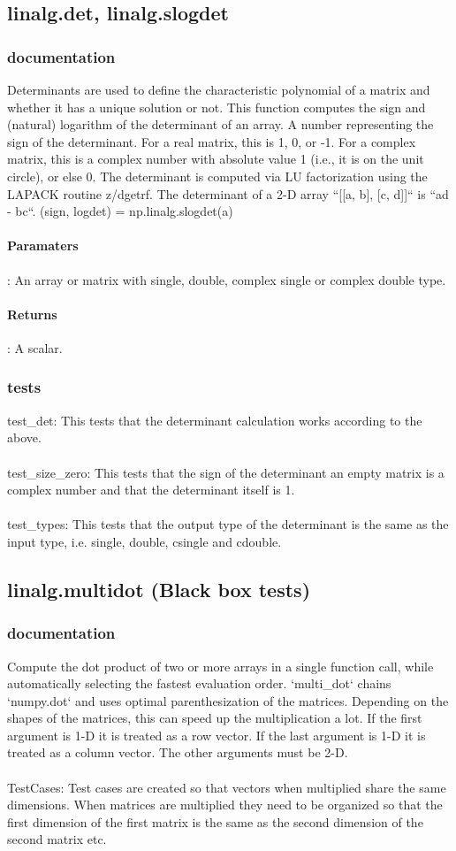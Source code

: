 \documentclass[a4paper,11pt]{article}
\begin{document}
\subsection{linalg.det, linalg.slogdet}
\subsubsection{documentation}
Determinants are used to define the characteristic polynomial of a matrix and whether it has a unique solution or not. This function computes the sign and (natural) logarithm of the determinant of an array. A number representing the sign of the determinant. For a real matrix,
this is 1, 0, or -1. For a complex matrix, this is a complex number with absolute value 1 (i.e., it is on the unit circle), or else 0. The determinant is computed via LU factorization using the LAPACK
routine z/dgetrf. The determinant of a 2-D array ``[[a, b], [c, d]]`` is ``ad - bc``. (sign, logdet) = np.linalg.slogdet(a)
\paragraph{Paramaters}: An array or matrix with single, double, complex single or complex double type. 
\paragraph{Returns}: A scalar. 
\subsubsection{tests}
test\_det: This tests that the determinant calculation works according to the above. \\
\\
test\_size\_zero: This tests that the sign of the determinant an empty matrix is a complex number and that the determinant itself is 1. \\
\\
test\_types: This tests that the output type of the determinant is the same as the input type, i.e. single, double, csingle and cdouble. 

\subsection{linalg.multidot (Black box tests)}
\subsubsection{documentation}
Compute the dot product of two or more arrays in a single function call, while automatically selecting the fastest evaluation order. `multi\_dot` chains `numpy.dot` and uses optimal parenthesization of the matrices. Depending on the shapes of the matrices, this can speed up the multiplication a lot. If the first argument is 1-D it is treated as a row vector. If the last argument is 1-D it is treated as a column vector. The other arguments must be 2-D.\\
\\
TestCases: Test cases are created so that vectors when multiplied share the same dimensions. When matrices are multiplied they need to be organized so that the first dimension of the first matrix is the same as the second dimension of the second matrix etc. 
\end{document}
